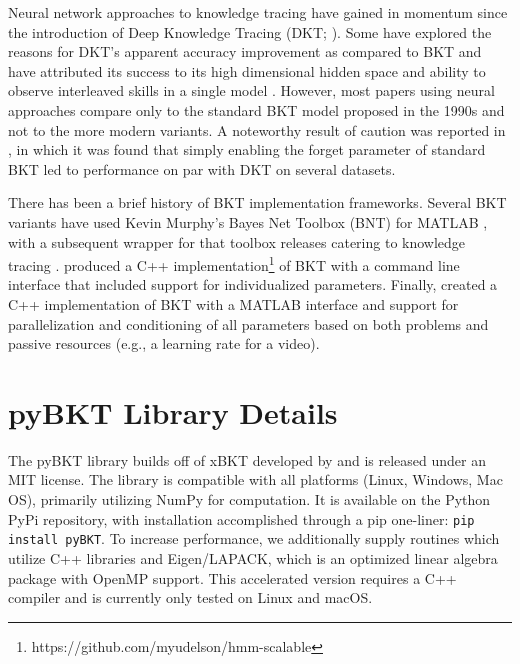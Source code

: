 \documentclass{edm_article}
\begin{document}

Neural network approaches to knowledge tracing have gained in momentum since the introduction of Deep Knowledge Tracing (DKT; \cite{piech2015deep}). Some have explored the reasons for DKT's apparent accuracy improvement as compared to BKT and have attributed its success to its high dimensional hidden space and ability to observe interleaved skills in a single model \cite{montero2018does}. However, most papers using neural approaches compare only to the standard BKT model proposed in the 1990s and not to the more modern variants. A noteworthy result of caution was reported in \citet{khajah2016deep}, in which it was found that simply enabling the forget parameter of standard BKT led to performance on par with DKT on several datasets.

There has been a brief history of BKT implementation frameworks. Several BKT variants have used Kevin Murphy's Bayes Net Toolbox (BNT) for MATLAB \cite{murphy2001bayes}, with a subsequent wrapper for that toolbox releases catering to knowledge tracing \cite{chang2006bayes}. \citet{yudelson2013individualized} produced a C++ implementation\footnote{https://github.com/myudelson/hmm-scalable} of BKT with a command line interface that included support for individualized parameters. Finally, \citet{xu2015xbkt} created a C++ implementation of BKT with a MATLAB interface and support for parallelization and conditioning of all parameters based on both problems and passive resources (e.g., a learning rate for a video).


\section{pyBKT Library Details}
The pyBKT library builds off of xBKT developed by \citet{xu2015xbkt} and is released under an MIT license. The library is compatible with all platforms (Linux, Windows, Mac OS), primarily utilizing NumPy \cite{walt2011numpy} for computation. It is available on the Python PyPi repository, with installation accomplished through a pip one-liner: \verb+pip install pyBKT+. To increase performance, we additionally supply routines which utilize C++ libraries and Eigen/LAPACK, which is an optimized linear algebra package with OpenMP support. This accelerated version requires a C++ compiler and is currently only tested on Linux and macOS.
\end{document}
